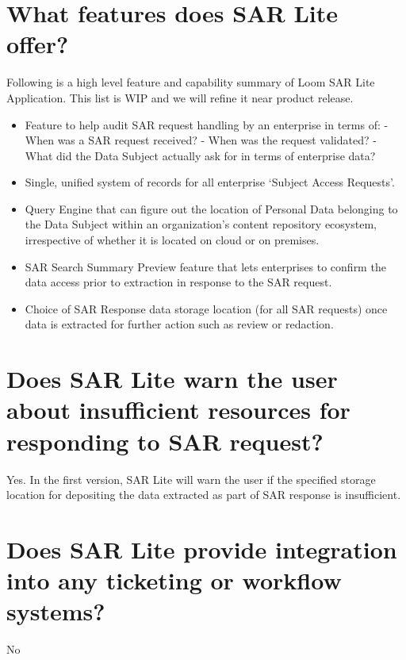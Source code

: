 \documentclass[letterpaper,10pt,english]{sphinxmanual}
\begin{document}
\section{What features does SAR Lite offer?}
\label{\detokenize{loom_trbs_faq:what-features-does-sar-lite-offer}}
Following is a high level feature and capability summary of Loom SAR Lite Application. This list is WIP and we will refine it near product release.
\begin{itemize}
\item {} 
Feature to help audit SAR request handling by an enterprise in terms of:
- When was a SAR request received?
- When was the request validated?
- What did the Data Subject actually ask for in terms of enterprise data?

\item {} 
Single, unified system of records for all enterprise ‘Subject Access Requests’.

\item {} 
Query Engine that can figure out the location of Personal Data belonging to the Data Subject within an organization’s content repository ecosystem, irrespective of whether it is located on cloud or on premises.

\item {} 
SAR Search Summary Preview feature that lets enterprises to confirm the data access prior to extraction in response to the SAR request.

\item {} 
Choice of SAR Response data storage location (for all SAR requests) once data is extracted for further action such as review or redaction.

\end{itemize}


\section{Does SAR Lite warn the user about insufficient resources for responding to SAR request?}
\label{\detokenize{loom_trbs_faq:does-sar-lite-warn-the-user-about-insufficient-resources-for-responding-to-sar-request}}
Yes. In the first version, SAR Lite will warn the user if the specified storage location for depositing the data extracted as part of SAR response is insufficient.


\section{Does SAR Lite provide integration into any ticketing or workflow systems?}
\label{\detokenize{loom_trbs_faq:does-sar-lite-provide-integration-into-any-ticketing-or-workflow-systems}}
No
\end{document}
